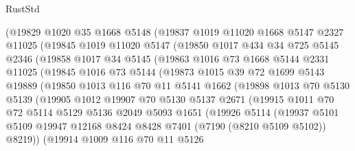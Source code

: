 \begin{lexlean}{RustStd}
\begin{coremodule}
      (@19829
        @1020
        @35
        @1668
        @5148
        (@19837
          @1019
          @11020
          @1668
          @5147
          @2327
          @11025
          (@19845
            @1019
            @11020
            @5147
            (@19850
              @1017
              @434
              @34
              @725
              @5145
              @2346
              (@19858
                @1017
                @34
                @5145
                (@19863
                  @1016
                  @73
                  @1668
                  @5144
                  @2331
                  @11025
                  (@19845
                    @1016
                    @73
                    @5144
                    (@19873
                      @1015
                      @39
                      @72
                      @1699
                      @5143
                      @19889
                      (@19850
                        @1013
                        @116
                        @70
                        @11
                        @5141
                        @1662
                        (@19898
                          @1013
                          @70
                          @5130
                          @5139
                          (@19905
                            @1012
                            @19907
                            @70
                            @5130
                            @5137
                            @2671
                            (@19915
                              @1011
                              @70
                              @72
                              @5114
                              @5129
                              @5136
                              @2049
                              @5093
                              @1651
                              (@19926
                                @5114
                                (@19937
                                  @5101
                                  @5109
                                  @19947
                                  @12168
                                  @8424
                                  @8428
                                  @7401
                                  (@7190 (@8210 @5109 @5102))
                                  @8219))
                              (@19914
                                @1009
                                @116
                                @70
                                @11
                                @5126

\end{coremodule}
\end{lexlean}

